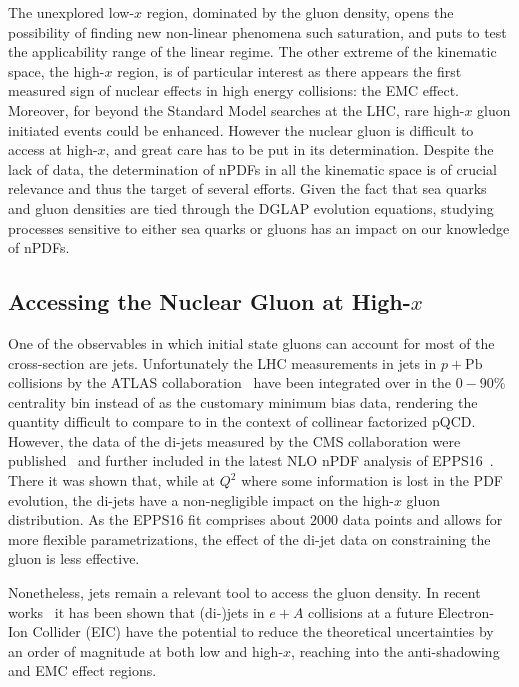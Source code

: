 The unexplored low-$x$ region, dominated by the gluon density, opens the possibility of finding new non-linear phenomena such saturation, and puts to test the applicability range of the linear regime. The other extreme of the kinematic space, the high-$x$ region, is of particular interest as there appears the first measured sign of nuclear effects in high energy collisions: the EMC effect. Moreover, for beyond the Standard Model searches at the LHC, rare high-$x$ gluon initiated events could be enhanced. However the nuclear gluon is difficult to access at high-$x$, and great care has to be put in its determination. Despite the lack of data, the determination of nPDFs in all the kinematic space is of crucial relevance and thus the target of several efforts. Given the fact that sea quarks and gluon densities are tied through the DGLAP evolution equations, studying processes sensitive to either sea quarks or gluons has an impact on our knowledge of nPDFs.    

\subsection{Accessing the Nuclear Gluon at High-$x$}

One of the observables in which initial state gluons can account for most of the cross-section are jets. Unfortunately the LHC measurements in jets in $p+\mathrm{Pb}$ collisions by the ATLAS collaboration~\cite{ATLAS:2014cpa} have been integrated over in the $0-90\%$ centrality bin instead of as the customary minimum bias data, rendering the quantity difficult to compare to in the context of collinear factorized pQCD. However, the data of the di-jets measured by the CMS collaboration were published~\cite{Chatrchyan:2014hqa} and further included in the latest NLO nPDF analysis of EPPS16~\cite{Eskola:2016oht}. There it was shown that, while at $Q^{2}$ where some information is lost in the PDF evolution, the di-jets have a non-negligible impact on the high-$x$ gluon distribution. As the EPPS16 fit comprises about $2000$ data points and allows for more flexible parametrizations, the effect of the di-jet data on constraining the gluon is less effective. %

Nonetheless, jets remain a relevant tool to access the gluon density. In recent works~\cite{PhysRevD.95.094013, PhysRevD.97.114013} it has been shown that (di-)jets in $e+A$ collisions at a future Electron-Ion Collider (EIC) have the potential to reduce the theoretical uncertainties by an order of magnitude at both low and high-$x$, reaching into the anti-shadowing and EMC effect regions.

